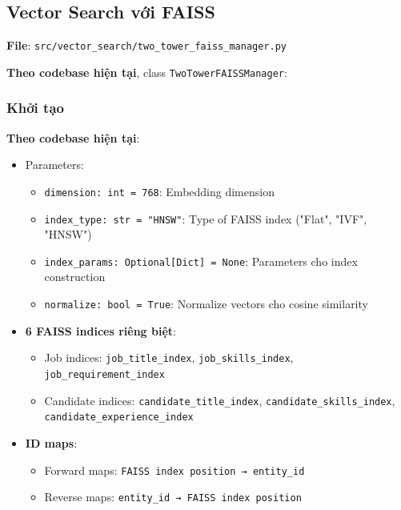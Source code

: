 \subsection{Vector Search với FAISS}

\textbf{File}: \texttt{src/vector\_search/two\_tower\_faiss\_manager.py}

\textbf{Theo codebase hiện tại}, class \texttt{TwoTowerFAISSManager}:

\subsubsection{Khởi tạo}

\textbf{Theo codebase hiện tại}:

\begin{itemize}
    \item Parameters:
    \begin{itemize}
        \item \texttt{dimension: int = 768}: Embedding dimension
        \item \texttt{index\_type: str = "HNSW"}: Type of FAISS index ("Flat", "IVF", "HNSW")
        \item \texttt{index\_params: Optional[Dict] = None}: Parameters cho index construction
        \item \texttt{normalize: bool = True}: Normalize vectors cho cosine similarity
    \end{itemize}
    
    \item \textbf{6 FAISS indices riêng biệt}:
    \begin{itemize}
        \item Job indices: \texttt{job\_title\_index}, \texttt{job\_skills\_index}, \texttt{job\_requirement\_index}
        \item Candidate indices: \texttt{candidate\_title\_index}, \texttt{candidate\_skills\_index}, \texttt{candidate\_experience\_index}
    \end{itemize}
    
    \item \textbf{ID maps}:
    \begin{itemize}
        \item Forward maps: \texttt{FAISS index position → entity\_id}
        \item Reverse maps: \texttt{entity\_id → FAISS index position}
    \end{itemize}
\end{itemize}

